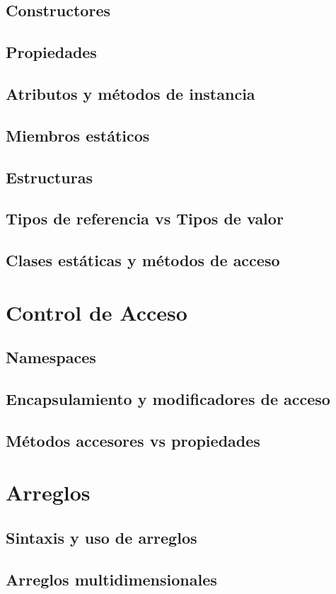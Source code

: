 \documentclass[12pt,a4paper]{report}
\begin{document}
\section{Constructores}
\section{Propiedades}
\section{Atributos y métodos de instancia}
\section{Miembros estáticos}
\section{Estructuras}
\section{Tipos de referencia vs Tipos de valor}
\section{Clases estáticas y métodos de acceso}

\chapter{Control de Acceso}
\section{Namespaces}
\section{Encapsulamiento y modificadores de acceso}
\section{Métodos accesores vs propiedades}

\chapter{Arreglos}
\section{Sintaxis y uso de arreglos}
\section{Arreglos multidimensionales}
\end{document}
